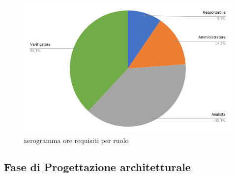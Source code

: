         \begin{figure}[!h]
            \caption{aerogramma ore requisiti per ruolo}
            \vspace{5px}
            \includegraphics[scale=0.5]{../../../Images/Diagrammi/Diagramma a torta/ore requisiti.png}
            \centering
        \end{figure}



\subsection{Fase di Progettazione architetturale}
